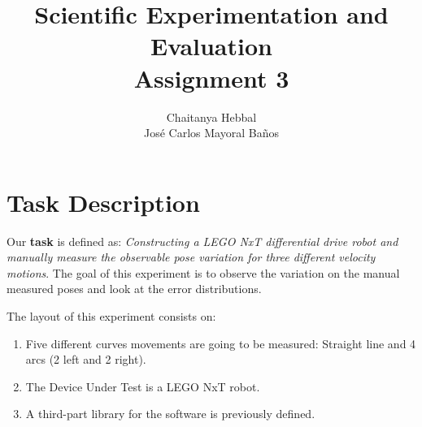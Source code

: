 \documentclass[10pt]{scrartcl}
\title{Scientific Experimentation and Evaluation\\
		\small{Assignment 3}}
\author{Chaitanya Hebbal\\
		Jos\'e Carlos Mayoral Ba\~nos}
\begin{document}
	\maketitle
\section*{Task Description}

Our \textbf{task} is defined as: \textit{Constructing a LEGO NxT differential drive robot and manually measure the observable pose variation for three different velocity motions}. The goal of this experiment is to observe the variation on the manual measured poses and look at the error distributions.



The layout of this experiment consists on:
\begin{enumerate}
	\item Five different curves movements are going to be measured: Straight line and 4 arcs (2 left and 2 right).
	\item The Device Under Test is a LEGO NxT robot.
	\item A third-part library for the software is previously defined.
\end{enumerate}
\end{document}
